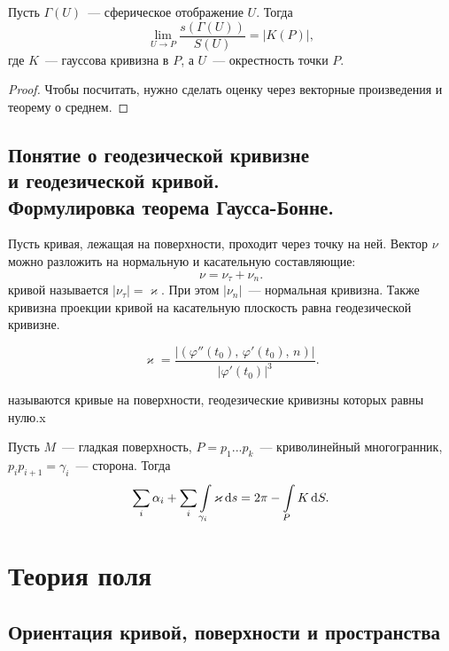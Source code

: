 \documentclass{notes}
\begin{document}
	\begin{thm}
		Пусть $\Gamma(U)$~--- сферическое отображение $U$. Тогда
		\[
			\lim_{U \to P} \dfrac{s(\Gamma(U))}{S(U)} = |K(P)|,
		\]
		где $K$~--- гауссова кривизна в $P$, а $U$~--- окрестность точки $P$.
		\begin{proof}
			Чтобы посчитать, нужно сделать оценку через векторные произведения и теорему о среднем.
		\end{proof}
	\end{thm}

\section{Понятие о геодезической кривизне \\ и геодезической кривой. \\ Формулировка теорема Гаусса-Бонне.}

	\begin{de}
		Пусть кривая, лежащая на поверхности, проходит через точку на ней. Вектор $\nu$ можно разложить на нормальную и касательную составляющие:
		\[
			\nu = \nu_{\tau} + \nu_n.
		\]
		 кривой называется $|\nu_{\tau}| = \varkappa$.
 		При этом $|\nu_n|$~--- нормальная кривизна.
 		Также кривизна проекции кривой на касательную плоскость равна геодезической кривизне.
	\end{de}

	\begin{st}
		\[
			\varkappa = \dfrac{|(\varphi''(t_0), \, \varphi'(t_0), \, n)|}{|\varphi'(t_0)|^3}.
		\]
	\end{st}

	\begin{de}
		 называются кривые на поверхности, геодезические кривизны которых равны нулю.x
	\end{de}

	\begin{thm}
		Пусть $M$~--- гладкая поверхность, $P = p_1...p_k$~--- криволинейный многогранник, $p_ip_{i+1} = \gamma_i$~--- сторона. Тогда
		\[
			\sum_i \alpha_i + \sum_i \int\limits_{\gamma_i} \varkappa \, \mathrm{d} s = 2 \pi - \int\limits_P K \, \mathrm{d} S.
		\]
	\end{thm}

\chapter{Теория поля}

\section{Ориентация кривой, поверхности и пространства}
\end{document}
